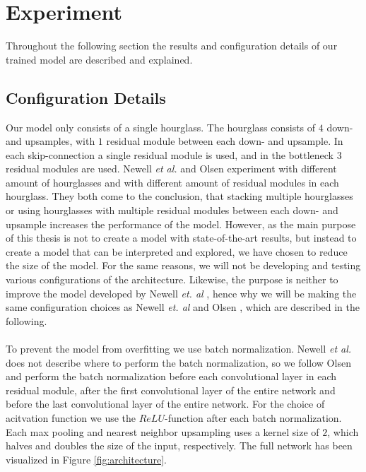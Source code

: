 \documentclass[./main.tex]{subfiles}
\begin{document}
\section{Experiment}
Throughout the following section the results and configuration details of our trained model are described and explained.

\subsection{Configuration Details}
Our model only consists of a single hourglass. The hourglass consists of $4$ down- and upsamples, with $1$ residual module between each down- and upsample. In each skip-connection a single residual module is used, and in the bottleneck $3$ residual modules are used. Newell \textit{et al.} \cite{Newell} and Olsen \cite{Camilla} experiment with different amount of hourglasses and with different amount of residual modules in each hourglass. They both come to the conclusion, that stacking multiple hourglasses or using hourglasses with multiple residual modules between each down- and upsample increases the performance of the model. However, as the main purpose of this thesis is not to create a model with state-of-the-art results, but instead to create a model that can be interpreted and explored, we have chosen to reduce the size of the model. For the same reasons, we will not be developing and testing various configurations of the architecture. Likewise, the purpose is neither to improve the model developed by Newell \textit{et. al} \cite{Newell}, hence why we will be making the same configuration choices as Newell \textit{et. al} \cite{Newell} and Olsen \cite{Camilla}, which are described in the following.
\\
\\
To prevent the model from overfitting we use batch normalization. Newell \textit{et al.} does not describe where to perform the batch normalization, so we follow Olsen \cite{Camilla} and perform the batch normalization before each convolutional layer in each residual module, after the first convolutional layer of the entire network and before the last convolutional layer of the entire network. For the choice of acitvation function we use the $ReLU$-function after each batch normalization. Each max pooling and nearest neighbor upsampling uses a kernel size of $2$, which halves and doubles the size of the input, respectively. The full network has been visualized in Figure \ref{fig:architecture}.
\\
\end{document}
